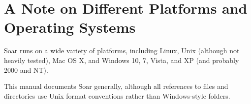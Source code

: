 \section{A Note on Different Platforms and Operating Systems}
\label{INTRO-platforms}

Soar runs on a wide variety of platforms, including Linux, Unix
(although not heavily tested), Mac OS X, and Windows 10, 7, Vista, and XP
(and probably 2000 and NT).

This manual documents Soar generally, although all references to files
and directories use Unix format conventions rather than Windows-style folders.

